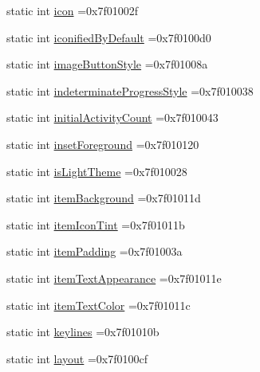 \begin{DoxyCompactItemize}
\item 
static int \hyperlink{classandroid_1_1support_1_1v7_1_1appcompat_1_1R_1_1attr_a1495dfa420da91a99a7d7c104558f64b}{icon} =0x7f01002f
\item 
static int \hyperlink{classandroid_1_1support_1_1v7_1_1appcompat_1_1R_1_1attr_a2f5e13cb01c52d709d8f0ca2895285e9}{iconified\+By\+Default} =0x7f0100d0
\item 
static int \hyperlink{classandroid_1_1support_1_1v7_1_1appcompat_1_1R_1_1attr_aaf6e8d174819edbd2057100e1d00b6e7}{image\+Button\+Style} =0x7f01008a
\item 
static int \hyperlink{classandroid_1_1support_1_1v7_1_1appcompat_1_1R_1_1attr_adde2f2aab981417a891cc25b344b12a3}{indeterminate\+Progress\+Style} =0x7f010038
\item 
static int \hyperlink{classandroid_1_1support_1_1v7_1_1appcompat_1_1R_1_1attr_a05bd79550a679c584b4c3cddd8a08c7f}{initial\+Activity\+Count} =0x7f010043
\item 
static int \hyperlink{classandroid_1_1support_1_1v7_1_1appcompat_1_1R_1_1attr_a5890e2c1d15e1bb94792c2f019dca401}{inset\+Foreground} =0x7f010120
\item 
static int \hyperlink{classandroid_1_1support_1_1v7_1_1appcompat_1_1R_1_1attr_aa9f7641035ef1504e26fcecdfae556ab}{is\+Light\+Theme} =0x7f010028
\item 
static int \hyperlink{classandroid_1_1support_1_1v7_1_1appcompat_1_1R_1_1attr_af3d58ae96a7287454829f832ccdea6eb}{item\+Background} =0x7f01011d
\item 
static int \hyperlink{classandroid_1_1support_1_1v7_1_1appcompat_1_1R_1_1attr_af738acc31f8dda0a49c48ffdd0cd864f}{item\+Icon\+Tint} =0x7f01011b
\item 
static int \hyperlink{classandroid_1_1support_1_1v7_1_1appcompat_1_1R_1_1attr_a9d344008ecd9d058d86d949b6b8ce639}{item\+Padding} =0x7f01003a
\item 
static int \hyperlink{classandroid_1_1support_1_1v7_1_1appcompat_1_1R_1_1attr_a566e6b90192933c84b8d479a1afb59cf}{item\+Text\+Appearance} =0x7f01011e
\item 
static int \hyperlink{classandroid_1_1support_1_1v7_1_1appcompat_1_1R_1_1attr_a51093d2dda63df36db5124669cff2ee0}{item\+Text\+Color} =0x7f01011c
\item 
static int \hyperlink{classandroid_1_1support_1_1v7_1_1appcompat_1_1R_1_1attr_a96514f8a1e5f958fbf3a5ef892543368}{keylines} =0x7f01010b
\item 
static int \hyperlink{classandroid_1_1support_1_1v7_1_1appcompat_1_1R_1_1attr_ab829778c3ab95012bde4b7a24c7a489e}{layout} =0x7f0100cf

\end{DoxyCompactItemize}
